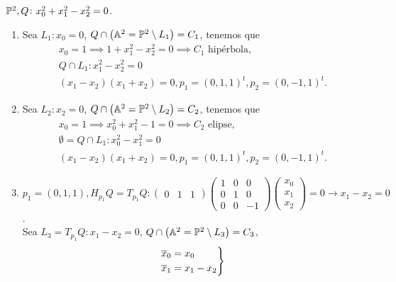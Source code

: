 \begin{example}
  $\mathbb{P}^2, Q \colon x_0^2 + x_1^2 - x_2^2 = 0$.
  \begin{enumerate}
    \item Sea $L_1 \colon x_0 = 0$, $Q\cap \left( \mathbb{A}^2 = \mathbb{P}^2 \setminus L_1 \right) = C_1$, tenemos que
      \begin{gather*}
        x_0 = 1 \implies 1+x_1^2 - x_2^2 = 0 \implies C_1 \text{ hipérbola}, \\
        Q \cap L_1 \colon x_1^2 - x_2^2 = 0 \\
        \left( x_1 -x_2 \right)\left( x_1 + x_2 \right) = 0, p_1 = \left( 0,1,1 \right)^t, p_2 = \left( 0,-1,1 \right)^t.
      \end{gather*}
    \item Sea $L_2 \colon x_2 = 0$, $Q\cap \left( \mathbb{A}^2 = \mathbb{P}^2 \setminus L_2 \right) = C_2$, tenemos que
      \begin{gather*}
        x_0 = 1 \implies x_0^2+x_1^2 - 1 = 0 \implies C_2 \text{ elipse}, \\
        \emptyset = Q \cap L_1 \colon x_0^2 - x_1^2 = 0 \\
        \left( x_1 -x_2 \right)\left( x_1 + x_2 \right) = 0, p_1 = \left( 0,1,1 \right)^t, p_2 = \left( 0,-1,1 \right)^t.
      \end{gather*}
    \item $p_1 = \left( 0,1,1 \right), H_{p_1}Q = T_{p_1}Q \colon
      \begin{pmatrix}
        0 & 1 & 1
      \end{pmatrix}
      \begin{pmatrix}
        1 & 0 & 0 \\
        0 & 1 & 0 \\
        0 & 0 & -1
      \end{pmatrix}
      \begin{pmatrix}
        x_0 \\ x_1 \\ x_2
      \end{pmatrix}
      = 0 \to x_1 - x_2 = 0$. \\
      Sea $L_3 = T_{p_1}Q \colon x_1 - x_2 = 0$, $Q\cap \left( \mathbb{A}^2 = \mathbb{P}^2 \setminus L_3 \right) = C_3$,
      \begin{gather*}
        \begin{rcases}
          \overline{x}_0 = x_0 \\
          \overline{x}_1 = x_1 - x_2 \\

\end{rcases}
\end{gather*}
\end{enumerate}
\end{example}
